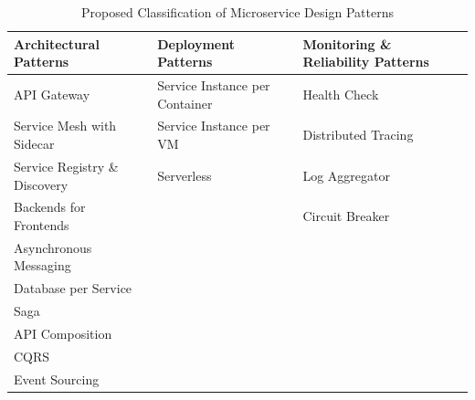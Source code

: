 \documentclass{Configuration_Files/PoliMi3i_thesis}
\begin{document}
\begin{table}[H]
\centering 
    \begin{tabular}{ 
  | >{\centering\arraybackslash} m{12em} 
  | >{\centering\arraybackslash} m{12em} 
  | >{\centering\arraybackslash} m{12em} | }
    \hline
    \rowcolor{bluepoli!40}
    \textbf{Architectural Patterns} & \textbf{Deployment Patterns} & \textbf{Monitoring \& Reliability Patterns}\T\B \\
    \hline \hline
    API Gateway & Service Instance per Container & Health Check\T\B\\
    \hline
    \rowcolor{bluepoli!10}
    Service Mesh with Sidecar & Service Instance per VM & Distributed Tracing\T\B\\
    \hline
    Service Registry \& Discovery & Serverless & Log Aggregator\T\B\\
    \hline
    \rowcolor{bluepoli!10}
    Backends for Frontends &  & Circuit Breaker\T\B\\
    \hline
    Asynchronous Messaging & & \T\B\\
    \hline
    \rowcolor{bluepoli!10}
    Database per Service & & \T\B\\
    \hline
    Saga & & \T\B\\
    \hline
    \rowcolor{bluepoli!10}
    API Composition & & \T\B\\
    \hline
    CQRS & & \T\B\\
    \hline
    \rowcolor{bluepoli!10}
    Event Sourcing & & \T\B\\
    \hline
    \end{tabular}
    \\[10pt]
    \caption{Proposed Classification of Microservice Design Patterns}
    \label{table:pattern_table}
\end{table}
\\
\end{document}
